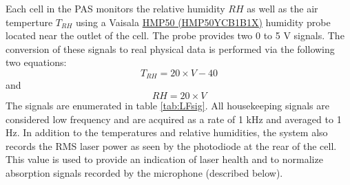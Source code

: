 \documentclass[10pt,twocolumn, twoside, openright]{article}
\begin{document}
%
Each cell in the PAS monitors the relative humidity $RH$ as well as the air temperture $T_{RH}$ using a Vaisala \href{http://www.fondriest.com/products/vaisala_hmp50yab1b1x.htm}{HMP50 (HMP50YCB1B1X)} humidity probe located near the outlet of the cell.  The probe provides two 0 to 5 V signals.  The conversion of these signals to real physical data is performed via the following two equations:
\begin{equation}\label{eq:TRH}
	T_{RH} = 20\times V -40
\end{equation}
%
and 
\begin{equation}\label{eq:RH}
	RH = 20\times V
\end{equation}
%
The signals are enumerated in table \ref{tab:LFsig}.  All housekeeping signals are considered low frequency and are acquired as a rate of 1 kHz and averaged to 1 Hz.  In addition to the temperatures and relative humidities, the system also records the RMS laser power as seen by the photodiode at the rear of the cell.  This value is used to provide an indication of laser health and to normalize absorption signals recorded by the microphone (described below).
%
\end{document}
